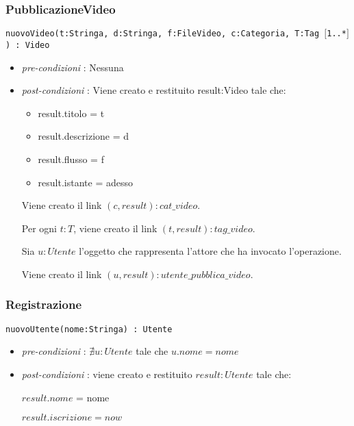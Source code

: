 \documentclass[12pt, letterpaper]{article}
\newcommand{\code}[1]{\colorbox{light-gray}{\texttt{#1}}}
\begin{document}
\subsubsection{PubblicazioneVideo}
\code{nuovoVideo(t:Stringa, d:Stringa, f:FileVideo, c:Categoria, T:Tag $[$1..*$]$) : Video }\begin{itemize}
    \item \textit{pre-condizioni} : Nessuna
    \item \textit{post-condizioni} :  
    Viene creato e restituito result:Video tale che:\begin{itemize}
        \item  result.titolo = t
        \item  result.descrizione = d
        \item  result.flusso = f
        \item  result.istante = adesso
\end{itemize}
Viene creato il link $(c, result): cat\_video$.

Per ogni $t:T$, viene creato il link $(t,result): tag\_video$.

Sia $u:Utente$ l'oggetto che rappresenta l'attore che ha 
invocato l'operazione.

Viene creato il link $(u,result): utente\_pubblica\_video$.
\end{itemize}
\subsubsection{Registrazione}
\code{nuovoUtente(nome:Stringa) : Utente}\begin{itemize}
    \item \textit{pre-condizioni} : $\nexists u:Utente$ tale che $u.nome = nome$
    \item \textit{post-condizioni} :  
    viene creato e restituito $result:Utente$ tale che:

				$result.nome$ = nome

				$result.iscrizione=now$ 
\end{itemize}
\end{document}
